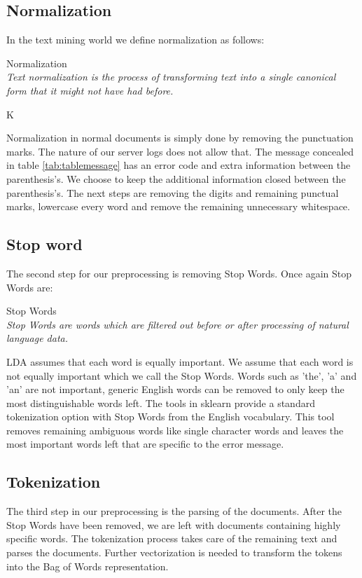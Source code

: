 \subsection{Normalization}
In the text mining world we define normalization as follows: \\

\theoremstyle{definition} 
\begin{definition}{Normalization} 
\\\textit{Text normalization is the process of transforming text into a single canonical form that it might not have had before.}
\end{definition}K

Normalization in normal documents is simply done by removing the punctuation marks. The nature of our server logs does not allow that.  The message concealed in table \ref{tab:tablemessage} has an error code and extra information between the parenthesis's. We choose to keep the additional information closed between the parenthesis's. The next steps are removing the digits and remaining punctual marks, lowercase every word and remove the remaining unnecessary whitespace. 

\subsection{Stop word}\label{methodology:stop_words}
The second step for our preprocessing is removing Stop Words. Once again Stop Words are:

\theoremstyle{definition} 
\begin{definition}{Stop Words} 
\\\textit{Stop Words are words which are filtered out before or after processing of natural language data.}
\end{definition}

LDA assumes that each word is equally important. We assume that each word is not equally important which we call the Stop Words. Words such as 'the', 'a' and 'an' are not important, generic English words can be removed to only keep the most distinguishable words left. The tools in sklearn provide a standard tokenization option with Stop Words from the English vocabulary. This tool removes remaining ambiguous words like single character words and leaves the most important words left that are specific to the error message.

\subsection{Tokenization}\label{methodology:tokenization}
The third step in our preprocessing is the parsing of the documents. After the Stop Words have been removed, we are left with documents containing highly specific words. The tokenization process takes care of the remaining text and parses the documents. Further vectorization is needed to transform the tokens into the Bag of Words representation.

